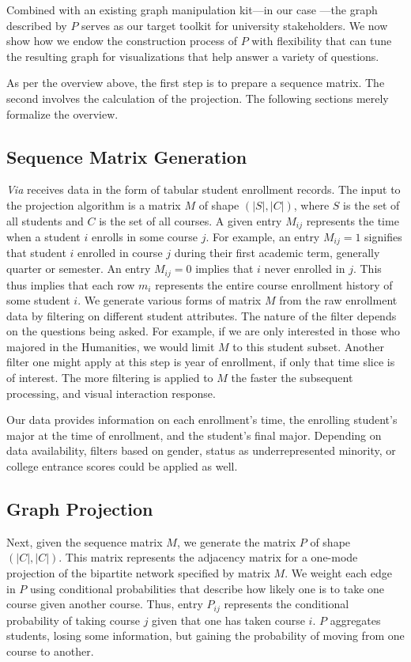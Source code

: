 Combined with an existing graph manipulation kit---in our case
\cite{shannon2003cytoscape}---the graph described by $P$ serves as our
target toolkit for university stakeholders. We now show how we endow
the construction process of $P$ with flexibility that can tune the
resulting graph for visualizations that help answer a variety of
questions.

As per the overview above, the first step is to prepare a sequence
matrix. The second involves the calculation of the projection. The
following sections merely formalize the overview.

\subsection{Sequence Matrix Generation}
\label{sec:seq_martix}

{\em Via} receives data in the form of tabular student enrollment
records. The input to the projection algorithm is a matrix $M$ of
shape $(|S|, |C|)$, where $S$ is the set of all students and $C$ is
the set of all courses. A given entry $M_{ij}$ represents the time
when a student $i$ enrolls in some course $j$. For example, an entry
$M_{ij} = 1$ signifies that student $i$ enrolled in course $j$ during
their first academic term, generally quarter or semester. An entry
$M_{ij} = 0$ implies that $i$ never enrolled in $j$. This thus implies
that each row $m_i$ represents the entire course enrollment history of
some student $i$. We generate various forms of matrix $M$ from the raw
enrollment data by filtering on different student attributes. The
nature of the filter depends on the questions being asked. For
example, if we are only interested in those who majored in the Humanities, we would
limit $M$ to this student subset. Another filter one might apply at
this step is year of enrollment, if only that time slice is of
interest. The more filtering is applied to $M$ the faster the
subsequent processing, and visual interaction response.

Our data provides information on each enrollment's time, the enrolling
student's major at the time of enrollment, and the student's final
major. Depending on data availability, filters based on gender, status
as underrepresented minority, or college entrance scores could be
applied as well.

\subsection{Graph Projection}
\label{sec:graph_projection}
Next, given the sequence matrix $M$, we generate the matrix $P$ of
shape $(|C|, |C|)$. This matrix represents the adjacency matrix for a
one-mode projection of the bipartite network specified by matrix
$M$. We weight each edge in $P$ using conditional probabilities that
describe how likely one is to take one course given another
course. Thus, entry $P_{ij}$ represents the conditional probability of
taking course $j$ given that one has taken course $i$. $P$ aggregates
students, losing some information, but gaining the probability of moving from one course to another.


